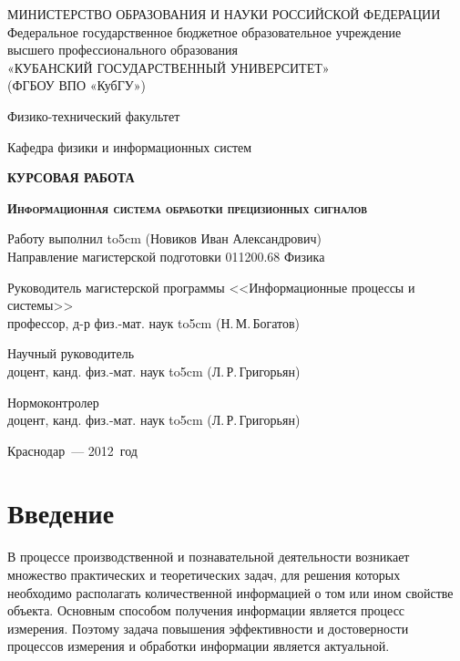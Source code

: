 \documentclass[a4paper, 14pt, titlepage]{extarticle}
\author{\theauthor, кафедра физики и информационных систем КубГУ}
\title{\thetitle}
\newcommand\sectiontoc[1]{\section*{#1}\addcontentsline{toc}{section}{#1}}
\newcommand{\underscore}[1]{\hbox to#1{\hrulefill}}
\let\oldsection\section
\renewcommand{\section}{\newpage\oldsection}
\newcommand{\thetitle}{Информационная система обработки прецизионных сигналов}
\begin{document}

  \thispagestyle{empty}
  \begin {center}
  МИНИСТЕРСТВО ОБРАЗОВАНИЯ И НАУКИ РОССИЙСКОЙ ФЕДЕРАЦИИ\\
  Федеральное государственное бюджетное образовательное учреждение\\
  высшего профессионального образования\\
  «КУБАНСКИЙ ГОСУДАРСТВЕННЫЙ УНИВЕРСИТЕТ»\\
  (ФГБОУ ВПО «КубГУ»)

  Физико-технический факультет

  \vspace {1cm}

  Кафедра физики и информационных систем

  \vspace {3.5cm}

  \textbf{КУРСОВАЯ РАБОТА}

  \vspace {0.5cm}

  \textbf{ \large \scshape \thetitle }

  \vspace {1.5cm}

  \begin{flushleft}
    Работу выполнил \underscore{5cm} (Новиков Иван Александрович)\\
    Направление магистерской подготовки 011200.68 Физика

    Руководитель магистерской программы <<Информационные процессы и системы>>\\
    профессор, д-р физ.-мат. наук \underscore{5cm} (Н.\,М.\,Богатов)

    Научный руководитель\\
    доцент, канд. физ.-мат. наук \underscore{5cm} (Л.\,Р.\,Григорьян)

    Нормоконтролер\\
    доцент, канд. физ.-мат. наук \underscore{5cm} (Л.\,Р.\,Григорьян)
  \end{flushleft}

  \vspace {2cm}

  Краснодар~--- 2012~год
  \end {center}


  \tableofcontents

  \sectiontoc{Введение}

  В процессе производственной и познавательной деятельности возникает множество практических и
  теоретических задач, для решения которых необходимо располагать количественной информацией о том
  или ином свойстве объекта. Основным способом получения информации является процесс измерения.
  Поэтому задача повышения эффективности и достоверности процессов измерения и обработки информации
  является актуальной.
\end{document}

